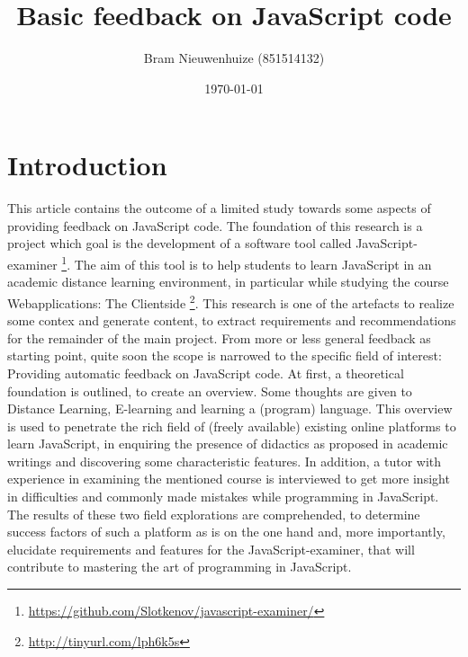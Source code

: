\documentclass{article}
\begin{document}
 

\title{Basic feedback on JavaScript code} \author{Bram Nieuwenhuize (851514132)} 
\date{\today} \maketitle 

\section{Introduction} This article contains the outcome of a limited study 
towards 
some aspects of providing feedback on JavaScript code. The foundation of this 
research is a project which goal is the development of a software tool called 
JavaScript-examiner
\footnote{\url{https://github.com/Slotkenov/javascript-examiner/}}.
The aim of this tool is to help students to learn 
JavaScript in an academic distance learning environment, in particular
while studying the course Webapplications: The Clientside 
\footnote{\url{http://tinyurl.com/lph6k5s}}. This research is one of 
the artefacts to realize some contex and generate content, to extract 
requirements and recommendations for the remainder of the main project. \newline 
From more or less general feedback as starting point, quite soon the scope is 
narrowed to the specific field of interest: Providing automatic feedback on 
JavaScript code. At first, a theoretical foundation is outlined, to create an 
overview. Some thoughts are given to Distance Learning, E-learning and 
learning a (program) language.
This overview is used to penetrate the rich field of (freely 
available) existing online platforms to learn JavaScript, in enquiring the
presence of didactics as proposed in academic writings and discovering some 
characteristic features. In addition, a tutor with experience in examining
the mentioned course is 
interviewed to get more insight in difficulties and commonly made mistakes while 
programming in JavaScript. The results of these two field explorations are 
comprehended, to determine success factors of such a platform as is on the one 
hand and, more importantly, elucidate requirements and features for the 
JavaScript-examiner, that will contribute to mastering the art of programming in 
JavaScript. 
\end{document}
